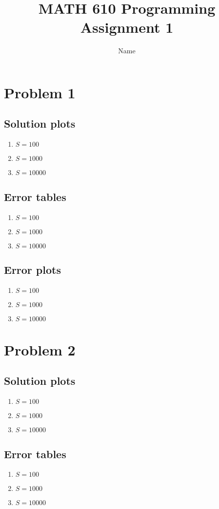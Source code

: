\documentclass{report}
\title{MATH 610 Programming Assignment 1}
\author{Name}
\date{}
\begin{document}
\maketitle

\chapter*{Problem 1}
\section*{Solution plots}
\begin{enumerate}
  \item $S = 100$
  \item $S = 1000$
  \item $S = 10000$
\end{enumerate}
\section*{Error tables}
\begin{enumerate}
  \item $S = 100$
  \item $S = 1000$
  \item $S = 10000$
\end{enumerate}
\section*{Error plots}
\begin{enumerate}
  \item $S = 100$
  \item $S = 1000$
  \item $S = 10000$
\end{enumerate}

\chapter*{Problem 2}
\section*{Solution plots}
\begin{enumerate}
  \item $S = 100$
  \item $S = 1000$
  \item $S = 10000$
\end{enumerate}
\section*{Error tables}
\begin{enumerate}
  \item $S = 100$
  \item $S = 1000$
  \item $S = 10000$
\end{enumerate}
\end{document}

